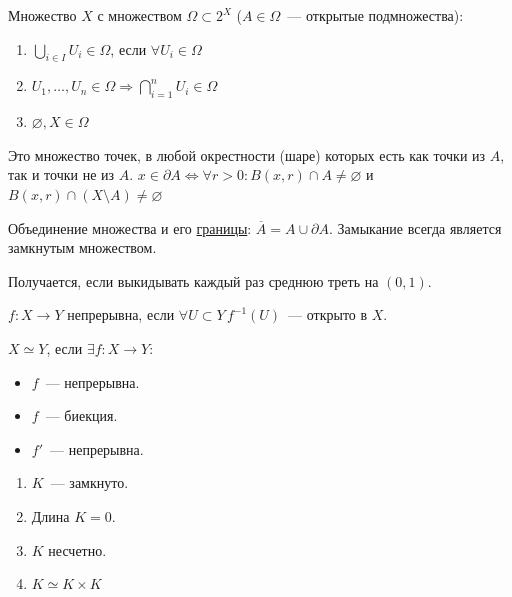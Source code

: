 \documentclass[12pt]{article}
\begin{document}
	\begin{definition}
		Множество $X$ с множеством $\Omega \subset 2^X$ ($A \in \Omega$~--- открытые подмножества):
		\begin{enumerate}
			\item $\bigcup\limits_{i \in I} U_i \in \Omega$, если $\forall U_i \in \Omega$
			\item $U_1, \dots, U_n \in \Omega \Rightarrow \bigcap\limits_{i=1}^n U_i \in \Omega$
			\item $\varnothing, X \in \Omega$
		\end{enumerate}
	\end{definition}
	
	\begin{definition}
		\label{border-def}
		Это множество точек, в любой окрестности (шаре) которых есть как точки из $A$, так и точки не из $A$. $x \in \partial A \Leftrightarrow \forall r > 0: B(x, r) \cap A \ne \varnothing$ и $B(x, r) \cap (X \setminus A) \ne \varnothing$
	\end{definition}
	
	\begin{definition}
		Объединение множества и его \hyperref[border-def]{границы}: $\overline{A} = A \cup \partial A$. Замыкание всегда является замкнутым множеством.
	\end{definition}
	
	\begin{definition}
		Получается, если выкидывать каждый раз среднюю треть на $(0, 1)$.
	\end{definition}
	
	\begin{definition}
		$f: X \rightarrow Y$ непрерывна, если $\forall U \subset Y \, f^{-1} (U)$~--- открыто в $X$.
	\end{definition}
	
	\begin{definition}[Гомеоморфизм]
		$X \simeq Y$, если $\exists f: X \rightarrow Y$:
		\begin{itemize}
			\item $f$~--- непрерывна.
			\item $f$~--- биекция.
			\item $f'$~--- непрерывна.
		\end{itemize}
	\end{definition}
	
	\begin{property}
		\begin{enumerate}
			\item $K$~--- замкнуто.
			\item Длина $K = 0$.
			\item $K$ несчетно.
			\item $K \simeq K \times K$
		\end{enumerate}
	\end{property}
	
\end{document}
